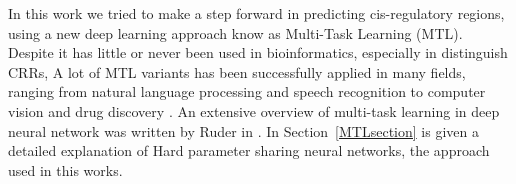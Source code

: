 In this work we tried to make a step forward in predicting cis-regulatory
regions, using a new deep learning approach know as Multi-Task Learning
(MTL). Despite it has little or never been used in bioinformatics,
especially in distinguish CRRs, A lot of MTL variants has been successfully applied in many
fields, ranging from natural language processing \cite{CollobertWeston2008} and speech recognition \cite{Deng2013} to computer vision \cite{Girshick2015} and drug discovery \cite{Ramsundar2015}. An extensive overview of multi-task learning in deep neural network was written by Ruder in \cite{Ruder2017}. In Section~\ref{MTLsection} is given a detailed explanation of Hard parameter sharing neural networks, the approach used in this works.